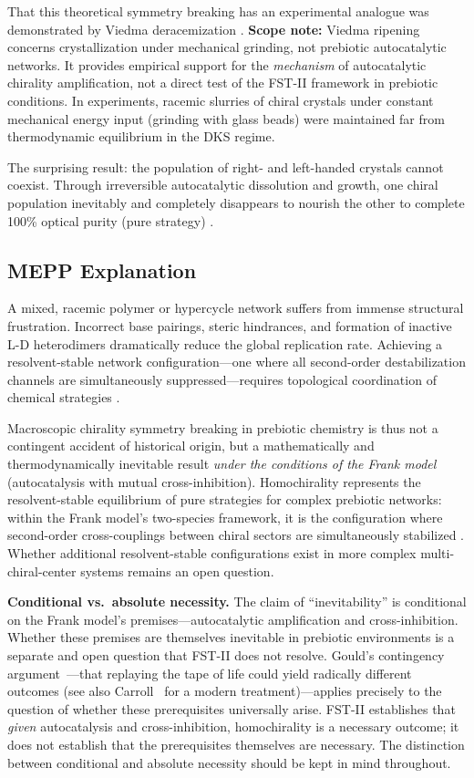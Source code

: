 \documentclass[12pt,a4paper]{article}
\theoremstyle{remark}
\begin{document}
That this theoretical symmetry breaking has an experimental analogue was demonstrated by Viedma deracemization \citep{HomochiralityThermo}. \textbf{Scope note:} Viedma ripening concerns crystallization under mechanical grinding, not prebiotic autocatalytic networks. It provides empirical support for the \emph{mechanism} of autocatalytic chirality amplification, not a direct test of the FST-II framework in prebiotic conditions. In experiments, racemic slurries of chiral crystals under constant mechanical energy input (grinding with glass beads) were maintained far from thermodynamic equilibrium in the DKS regime.

The surprising result: the population of right- and left-handed crystals cannot coexist. Through irreversible autocatalytic dissolution and growth, one chiral population inevitably and completely disappears to nourish the other to complete 100\% optical purity (pure strategy) \citep{HomochiralityThermo}.

\subsection{MEPP Explanation}

A mixed, racemic polymer or hypercycle network suffers from immense structural frustration. Incorrect base pairings, steric hindrances, and formation of inactive L-D heterodimers dramatically reduce the global replication rate. Achieving a resolvent-stable network configuration---one where all second-order destabilization channels are simultaneously suppressed---requires topological coordination of chemical strategies \citep{Biochirality}.

Macroscopic chirality symmetry breaking in prebiotic chemistry is thus not a contingent accident of historical origin, but a mathematically and thermodynamically inevitable result \emph{under the conditions of the Frank model} (autocatalysis with mutual cross-inhibition). Homochirality represents the resolvent-stable equilibrium of pure strategies for complex prebiotic networks: within the Frank model's two-species framework, it is the configuration where second-order cross-couplings between chiral sectors are simultaneously stabilized \citep{Biochirality}. Whether additional resolvent-stable configurations exist in more complex multi-chiral-center systems remains an open question.

\textbf{Conditional vs.\ absolute necessity.} The claim of ``inevitability'' is conditional on the Frank model's premises---autocatalytic amplification and cross-inhibition. Whether these premises are themselves inevitable in prebiotic environments is a separate and open question that FST-II does not resolve. Gould's contingency argument~\citep{Gould1989}---that replaying the tape of life could yield radically different outcomes (see also Carroll~\citep{UnbecomingBeing} for a modern treatment)---applies precisely to the question of whether these prerequisites universally arise. FST-II establishes that \emph{given} autocatalysis and cross-inhibition, homochirality is a necessary outcome; it does not establish that the prerequisites themselves are necessary. The distinction between conditional and absolute necessity should be kept in mind throughout.
\end{document}
